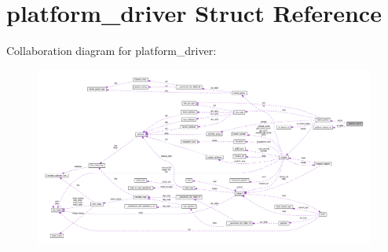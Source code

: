 \hypertarget{structplatform__driver}{}\section{platform\+\_\+driver Struct Reference}
\label{structplatform__driver}


Collaboration diagram for platform\+\_\+driver\+:
\nopagebreak
\begin{figure}[H]
\begin{center}
\leavevmode
\includegraphics[width=350pt]{structplatform__driver__coll__graph}
\end{center}
\end{figure}
